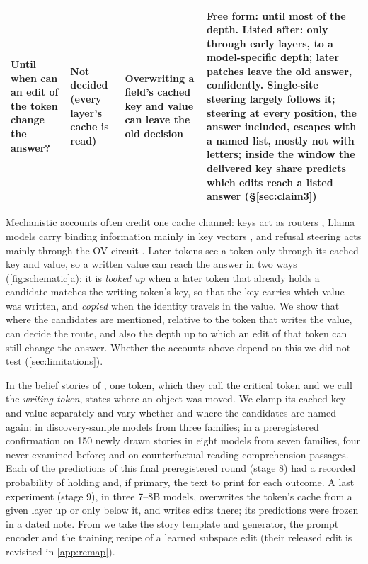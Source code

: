 \begin{table}[t]
\begin{tabular}{@{}p{}p{}p{}p{}@{}}
    \raggedright Until when can an edit of the token change the answer? & \raggedright Not decided (every layer's cache is read) & \raggedright Overwriting a field's cached key and value can leave the old decision \citep{bojieli2026notes} & Free form: until most of the depth. Listed after: only through early layers, to a model-specific depth; later patches leave the old answer, confidently. Single-site steering largely follows it; steering at every position, the answer included, escapes with a named list, mostly not with letters; inside the window the delivered key share predicts which edits reach a listed answer (\S\ref{sec:claim3}) \\
    \bottomrule
  \end{tabular}
\end{table}

Mechanistic accounts often credit one cache channel: keys act as routers \citep{ma2025addressbook}, Llama models carry binding information mainly in key vectors \citep{oh2026rebinding}, and refusal steering acts mainly through the OV circuit \citep{cheng2026steering}. Later tokens see a token only through its cached key and value, so a written value can reach the answer in two ways (\cref{fig:schematic}a): it is \emph{looked up} when a later token that already holds a candidate matches the writing token's key, so that the key carries which value was written, and \emph{copied} when the identity travels in the value. We show that where the candidates are mentioned, relative to the token that writes the value, can decide the route, and also the depth up to which an edit of that token can still change the answer. Whether the accounts above depend on this we did not test (\cref{sec:limitations}).

In the belief stories of \citet{anonymous2026fitted}, one token, which they call the critical token and we call the \emph{writing token}, states where an object was moved. We clamp its cached key and value separately and vary whether and where the candidates are named again: in \nModels{} discovery-sample models from three families; in a preregistered confirmation on 150 newly drawn stories in eight models from seven families, four never examined before; and on counterfactual reading-comprehension passages. Each of the \JxLinesABCD{} predictions of this final preregistered round (stage 8) had a recorded probability of holding and, if primary, the text to print for each outcome. A last experiment (stage 9), in three 7--8B models, overwrites the token's cache from a given layer up or only below it, and writes edits there; its predictions were frozen in a dated note. From \citet{anonymous2026fitted} we take the story template and generator, the prompt encoder and the training recipe of a learned subspace edit (their released edit is revisited in \cref{app:remap}).

